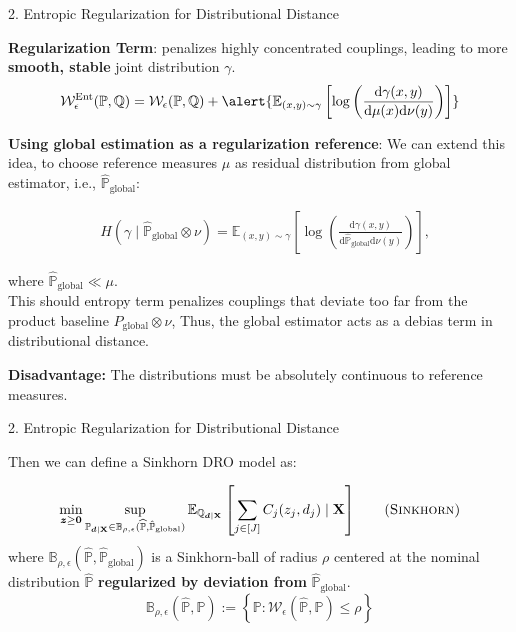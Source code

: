 \documentclass{beamer}
\newcommand{\mb}[1]{{\mathbf{#1}}}
\newcommand{\txrd}[1]{{\textcolor{sintefred}{\textbf{#1}}}}
\newcommand{\bbp}{\mathbb{P}}
\newcommand{\bbq}{\mathbb{Q}}
\begin{document}
\begin{frame}{2. Entropic Regularization for Distributional Distance}

\txrd{Regularization Term}: penalizes highly concentrated couplings, leading to more \txrd{smooth, stable} joint distribution $\gamma$.      
\begin{equation}
\mathcal{W}_\epsilon^{\mathrm{Ent}}(\mathbb{P},\mathbb{Q})=\mathcal{W}_\epsilon(\mathbb{P},\mathbb{Q})+ \alert{\mathbb{E}_{(x,y)\sim\gamma}\left[\log\left(\frac{\mathrm{d}\gamma(x,y)}{\mathrm{d}\mu(x)\mathrm{d}\nu(y)}\right)\right]}
\end{equation}

\txrd{Using global estimation as a regularization reference}: We can extend this idea, to choose reference measures $\mu$ as residual distribution from global estimator, i.e., $\hat{\mathbb{P}}_{\mathrm{global}}$:

\[
\begin{aligned}
 & H(\gamma\mid \hat{\mathbb{P}}_{\mathrm{global}}\otimes\nu)=\mathbb{E}_{(x,y)\sim\gamma}\left[\log\left(\frac{\mathrm{d}\gamma(x,y)}{\mathrm{d} \hat{\mathbb{P}}_{\mathrm{global}} \mathrm{d}\nu(y)}\right)\right],
\end{aligned}
\]

where $\hat{\mathbb{P}}_{\mathrm{global}} \ll\mu$. \\
This should entropy term \alert{penalizes couplings that deviate too far from the product baseline} $P_{\mathrm{global}}\otimes\nu$,
Thus, the global estimator acts as a \alert{debias term} in distributional distance.

\txrd{Disadvantage:} The distributions must be absolutely continuous to reference measures.

\end{frame}

\begin{frame}{2. Entropic Regularization for Distributional Distance}

 Then we can define a Sinkhorn DRO model as:

{\large
\begin{equation}
\min_{\bm z \geq \bm 0} \sup_{\bbp_{\bm d \mid \mb X} \in \mathbb{B}_{\rho,\epsilon}(\widehat{\mathbb{P}}, \hat{\mathbb{P}}_{\mathrm{global}}) }  \mathbb{E}_{\bbq_{\bm d \mid \mb X}} \left[\sum_{j \in [J]}   C_j (z_j,  d_j)  \mid \mb X \right] 
\label{Problem: Sinkhorn DRO model}
\tag{\sc{Sinkhorn}}
\end{equation}
}
where $\mathbb{B}_{\rho,\epsilon}(\widehat{\mathbb{P}}, \hat{\mathbb{P}}_{\mathrm{global}})$ is a Sinkhorn-ball of radius $\rho$ centered at the nominal distribution $\hat{\bbp}$ \txrd{regularized by deviation from} $\hat{\mathbb{P}}_{\mathrm{global}}$.
\[
\mathbb{B}_{\rho,\epsilon}(\widehat{\mathbb{P}}, {\mathbb{P}}):=\left\{\mathbb{P}:\mathcal{W}_\epsilon(\widehat{\mathbb{P}},\mathbb{P})\leq\rho\right\}
\]

\end{frame}
\end{document}
